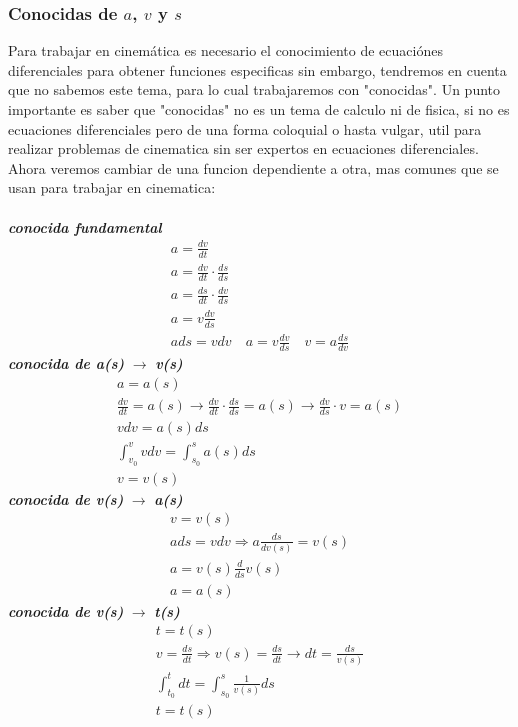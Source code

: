 \subsubsection*{Conocidas de $ a $, $v$ y $s$}
Para trabajar en cinemática es necesario el conocimiento de ecuaciónes diferenciales para obtener funciones especificas sin embargo, tendremos en cuenta que no sabemos este tema, para lo cual trabajaremos con "conocidas". Un punto importante es saber que "conocidas" no es un tema de calculo ni de fisica, si no es ecuaciones diferenciales pero de una forma coloquial o hasta vulgar, util para realizar problemas de cinematica sin ser expertos en ecuaciones diferenciales. \\
Ahora veremos cambiar de una funcion dependiente a otra, mas comunes que se usan para trabajar en cinematica: \\ \\
\textbf{\textit{conocida fundamental}}
\begin{gather*}
	a=\frac{dv}{dt} \\
	a=\frac{dv}{dt}\cdot\frac{ds}{ds} \\
	a=\frac{ds}{dt}\cdot\frac{dv}{ds} \\
	a=v\frac{dv}{ds} \\
	ads=vdv \quad a=v\frac{dv}{ds} \quad v=a\frac{ds}{dv}
\end{gather*}
\textbf{\textit{conocida de a(s) }} $ \rightarrow $ \textbf{\textit{v(s)}}
\begin{gather*}
	a=a(s) \\
	\frac{dv}{dt}=a(s) \rightarrow \frac{dv}{dt}\cdot\frac{ds}{ds} = a(s) \rightarrow
	\frac{dv}{ds}\cdot v = a(s) \\
	vdv=a(s)ds \\
	\int_{v_0}^{v}vdv=\int_{s_0}^{s}a(s)ds \\
	v = v(s) 
\end{gather*}		\textbf{\textit{conocida de v(s) }} $ \rightarrow $ \textbf{\textit{a(s)}}
\begin{gather*}
	v=v(s) \\
	ads=vdv\Rightarrow a\frac{ds}{dv(s)}=v(s) \\
	a=v(s)\frac{d}{ds}v(s) \\
	a=a(s)
\end{gather*}
\textbf{\textit{conocida de v(s) }} $ \rightarrow $ \textbf{\textit{t(s)}}
\begin{gather*}
	t=t(s) \\
	v=\frac{ds}{dt} \Rightarrow v(s)=\frac{ds}{dt} \rightarrow dt=\frac{ds}{v(s)} \\
	\int_{t_0}^{t}dt=\int_{s_0}^{s}\frac{1}{v(s)}ds \\
	t=t(s)
\end{gather*}

